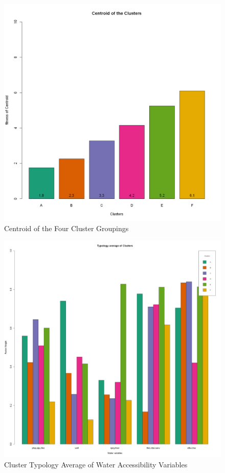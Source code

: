\documentclass[10pt,twoside]{article}
\numberwithin{equation}{section}
\newcommand{\?}{\stackrel{?}{=}}
\begin{document}
\begin{figure}[h!]
  \centering
  \includegraphics[width=.7\textwidth]{centroid}
  \caption{Centroid of the Four Cluster Groupings}
  \label{fig:centroid}
\end{figure}
\begin{figure}[h!]
  \centering
  \includegraphics[width=1\textwidth]{typology}
  \caption{Cluster Typology Average of Water Accessibility Variables }
  \label{fig:typology}
\end{figure}
\end{document}
